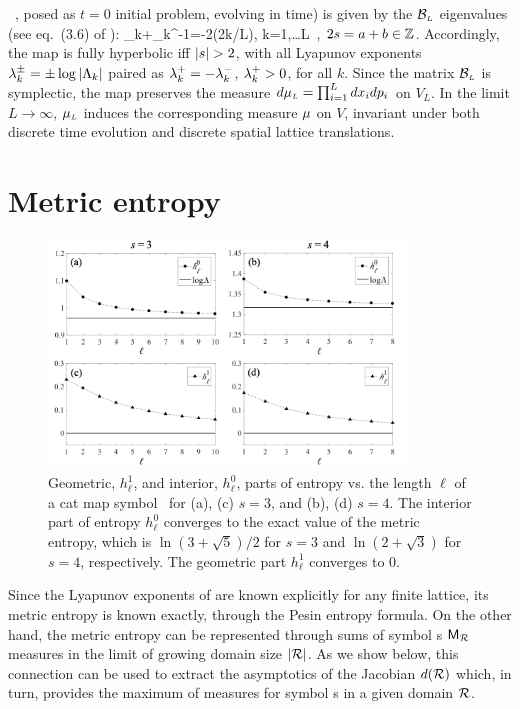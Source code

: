 \documentclass[12pt]{iopart}
\begin{document}
\catlatt\ , posed as $t=0$ initial problem, evolving in time)
is given by the $\mathcal{B}_{\scriptscriptstyle L}$ eigenvalues (see eq.~(3.6) of
):
\beq
 \ExpaEig_k+\ExpaEig_k^{-1}=-2\cos(2\pi k/L), \qquad k=1,\dots L
\,,
$2s=a+b \in \mathbb{Z}$.
Accordingly, the map  is fully hyperbolic iff $\edit{|s|>2}$, with all Lyapunov
exponents $\lambda_k^{\pm} = \pm\log|\Lambda_k|$ paired as $\lambda_k^+=
-\lambda_k^-$, $\lambda_k^+ >0$, for all $k$. Since the matrix
$\mathcal{B}_{\scriptscriptstyle L}$ is symplectic,  the map
  preserves the measure $d{\mu}_{\scriptscriptstyle
L}=\prod_{i=1}^L dx_i dp_i$ on $V_{\scriptscriptstyle L}$. In the limit
$L\to\infty$, ${\mu}_{\scriptscriptstyle L}$ induces the corresponding
measure ${\mu}$  on $V$, invariant under both discrete time evolution and
discrete spatial lattice translations.

\section{Metric entropy}
\label{sect:metricEntropy}
 \begin{figure}	
 	\centering
	\includegraphics[width=0.85\textwidth]{RJentropy_s3_s4}
        \hspace{0.1\textwidth}
	\caption{\label{fig:RJentropyPlot}
Geometric, $h_\ell^1$, and interior, $h_\ell^0$, parts of entropy vs. the
length $\ell$ of
    a cat map symbol \brick\
for
(a), (c) $s=3$, and
(b), (d) $s=4$.
The interior
    part of entropy
$h_\ell^0$ converges to the exact value of the metric entropy, which is
$\ln(3+\sqrt{5})/2$ for $s=3$ and $\ln(2+\sqrt{3})$ for $s=4$,
respectively.  The geometric part $h_\ell^1$ converges to $0$.
    }
\end{figure}

Since the Lyapunov exponents of {\catlatt} are known explicitly for any
finite lattice, its  metric entropy is known exactly, through the Pesin
entropy formula\rf{Pesin77}. On the other hand, the metric entropy can be
represented through  sums of symbol {\brick s} $\mathsf{M}_{\mathcal{R}}$ measures  in the
limit of growing domain size $|\mathcal{R}|$. As we show below, this connection
can be used to extract the asymptotics of the Jacobian $d(\mathcal{R})$ which, in
turn, provides the maximum  of measures for symbol {\brick s} in a given
domain $\mathcal{R}$.
\end{document}
